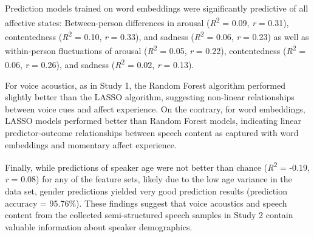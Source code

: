 \documentclass[
  man,floatsintext]{apa6}
\begin{document}
Prediction models trained on word embeddings were significantly predictive of all affective states: Between-person differences in arousal (\emph{R}\textsuperscript{2} = 0.09, \emph{r} = 0.31), contentedness (\emph{R}\textsuperscript{2} = 0.10, \emph{r} = 0.33), and sadness (\emph{R}\textsuperscript{2} = 0.06, \emph{r} = 0.23) as well as within-person fluctuations of arousal (\emph{R}\textsuperscript{2} = 0.05, \emph{r} = 0.22), contentedness (\emph{R}\textsuperscript{2} = 0.06, \emph{r} = 0.26), and sadness (\emph{R}\textsuperscript{2} = 0.02, \emph{r} = 0.13).

For voice acoustics, as in Study 1, the Random Forest algorithm performed slightly better than the LASSO algorithm, suggesting non-linear relationships between voice cues and affect experience. On the contrary, for word embeddings, LASSO models performed better than Random Forest models, indicating linear predictor-outcome relationships between speech content as captured with word embeddings and momentary affect experience.

Finally, while predictions of speaker age were not better than chance (\emph{R}\textsuperscript{2} = -0.19, \emph{r} = 0.08) for any of the feature sets, likely due to the low age variance in the data set, gender predictions yielded very good prediction results (prediction accuracy = 95.76\%). These findings suggest that voice acoustics and speech content from the collected semi-structured speech samples in Study 2 contain valuable information about speaker demographics.
\end{document}
